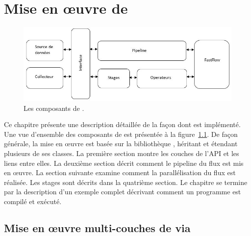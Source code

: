 
\chapter{Mise en \oe{}uvre de \PpFf}
\label{implementation.chap}





\begin{figure}
\centering
     \includegraphics[width=1.0\textwidth]{Figures/AllComponentsAPI.jpg}
      \caption{Les composants de .}
       \label{AllComponentsAPI.fig}
\end{figure}


Ce chapitre pr\'esente une description d\'etaill\'ee de la fa\c{c}on dont  est impl\'ement\'e. Une vue d'ensemble des composants de  est pr\'esent\'ee \`a la figure~\ref{AllComponentsAPI.fig}. De fa\c{c}on g\'en\'erale, la mise en \oe{}uvre est bas\'ee sur la biblioth\`eque , h\'eritant et \'etendant plusieurs de ses classes. La premi\`ere section montre les couches de l'API et les liens entre elles.  La deuxi\`eme section d\'ecrit comment le pipeline du flux est mis en œuvre. La section suivante examine comment la parall\'elisation du flux est r\'ealis\'ee. Les stages sont d\'ecrits dans la quatri\`eme section. Le chapitre se termine par la description d'un exemple complet d\'ecrivant comment un programme \PpFf{} est compil\'e et ex\'ecut\'e.


\section{Mise en \oe{}uvre multi-couches de \PpFf{} via }

